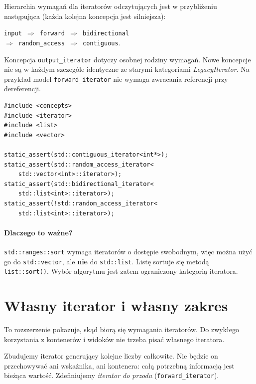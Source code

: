 Hierarchia wymagań dla iteratorów odczytujących jest w przybliżeniu
następująca (każda kolejna koncepcja jest silniejsza):

\begin{center}
\texttt{input $\Rightarrow$ forward $\Rightarrow$ bidirectional}
\\[2pt]
\texttt{$\Rightarrow$ random\_access $\Rightarrow$ contiguous}.
\end{center}

Koncepcja \texttt{output\_iterator} dotyczy osobnej rodziny wymagań.
Nowe koncepcje nie są w każdym szczególe identyczne ze starymi
kategoriami \emph{LegacyIterator}. Na przykład model
\texttt{forward\_iterator} nie wymaga zwracania referencji
przy dereferencji.

\begin{lstlisting}
#include <concepts>
#include <iterator>
#include <list>
#include <vector>

static_assert(std::contiguous_iterator<int*>);
static_assert(std::random_access_iterator<
    std::vector<int>::iterator>);
static_assert(std::bidirectional_iterator<
    std::list<int>::iterator>);
static_assert(!std::random_access_iterator<
    std::list<int>::iterator>);
\end{lstlisting}

\paragraph{Dlaczego to ważne?}
\texttt{std::ranges::sort} wymaga iteratorów o dostępie swobodnym,
więc można użyć go do \texttt{std::vector}, ale \textbf{nie} do
\texttt{std::list}. Listę sortuje się metodą \texttt{list::sort()}.
Wybór algorytmu jest zatem ograniczony kategorią iteratora.

\section{Własny iterator i własny zakres}
\label{sec:cpp8-own-iterator}

To rozszerzenie pokazuje, skąd biorą się wymagania iteratorów. Do
zwykłego korzystania z kontenerów i widoków nie trzeba pisać własnego
iteratora.

Zbudujemy iterator generujący kolejne liczby całkowite. Nie będzie on
przechowywać ani wskaźnika, ani kontenera: całą potrzebną informacją
jest bieżąca wartość. Zdefiniujemy \emph{iterator do przodu}
(\texttt{forward\_iterator}).


